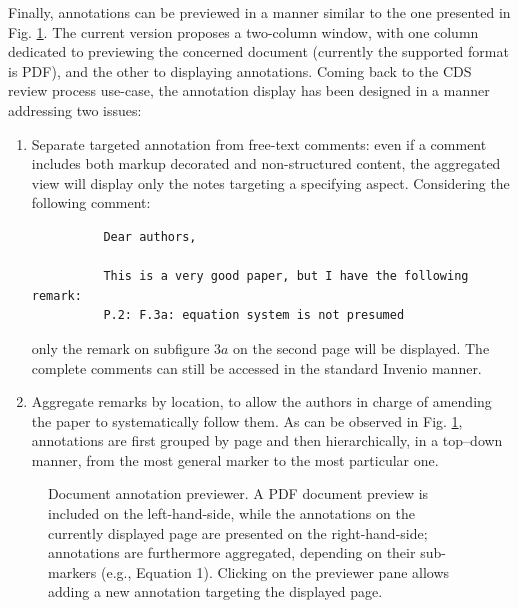 Finally, annotations can be previewed in a manner similar to the one presented
in Fig. \ref{fig:noteview}. The current version proposes a two-column window,
with one column dedicated to previewing the concerned document (currently the
supported format is PDF), and the other to displaying annotations. Coming
back to the CDS review process use-case, the annotation display has been
designed in a manner addressing two issues:
\begin{enumerate}
  \item Separate targeted annotation from free-text comments: even if a comment
        includes both markup decorated and non-structured content, the
        aggregated view will display only the notes targeting a specifying
        aspect. Considering the following comment:
        \begin{verbatim}
          Dear authors,

          This is a very good paper, but I have the following remark:
          P.2: F.3a: equation system is not presumed 
        \end{verbatim}
        only the remark on subfigure $3a$ on the second page will be displayed.
        The complete comments can still be accessed in the standard Invenio
        manner.
  \item Aggregate remarks by location, to allow the authors in charge of
        amending the paper to systematically follow them. As can be observed in
        Fig. \ref{fig:noteview}, annotations are first grouped by page and then
        hierarchically, in a top--down manner, from the most general marker to
        the most particular one.
\end{enumerate}

\begin{figure}[!ht]
  \centering
  \caption[Document annotation previewer]
          {Document annotation previewer. A PDF document preview is included on
           the left-hand-side, while the annotations on the currently displayed
           page are presented on the right-hand-side; annotations are
           furthermore aggregated, depending on their sub-markers (e.g.,
           Equation 1). Clicking on the previewer pane allows adding a new
           annotation targeting the displayed page.}
  \label{fig:noteview}
\end{figure}


